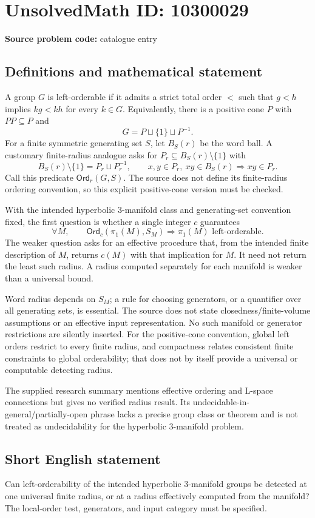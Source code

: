 \documentclass[11pt]{article}
\begin{document}
\section*{UnsolvedMath ID: 10300029}
\textbf{Source problem code:} catalogue entry
\subsection{Definitions and mathematical statement}
A group \(G\) is left-orderable if it admits a strict total order \(<\) such that \(g<h\) implies \(kg<kh\) for every \(k\in G\). Equivalently, there is a positive cone \(P\) with \(PP\subseteq P\) and
\[
G=P\sqcup\{1\}\sqcup P^{-1}.
\]
For a finite symmetric generating set \(S\), let \(B_S(r)\) be the word ball. A customary finite-radius analogue asks for \(P_r\subseteq B_S(r)\setminus\{1\}\) with
\[
B_S(r)\setminus\{1\}=P_r\sqcup P_r^{-1},\qquad
x,y\in P_r,\ xy\in B_S(r)\Longrightarrow xy\in P_r.
\]
Call this predicate \(\mathsf{Ord}_r(G,S)\). The source does not define its finite-radius ordering convention, so this explicit positive-cone version must be checked.

With the intended hyperbolic \(3\)-manifold class and generating-set convention fixed, the first question is whether a single integer \(c\) guarantees
\[
\forall M,\qquad
\mathsf{Ord}_c(\pi_1(M),S_M)\Longrightarrow\pi_1(M)\text{ left-orderable}.
\]
The weaker question asks for an effective procedure that, from the intended finite description of \(M\), returns \(c(M)\) with that implication for \(M\). It need not return the least such radius. A radius computed separately for each manifold is weaker than a universal bound.

Word radius depends on \(S_M\); a rule for choosing generators, or a quantifier over all generating sets, is essential. The source does not state closedness/finite-volume assumptions or an effective input representation. No such manifold or generator restrictions are silently inserted. For the positive-cone convention, global left orders restrict to every finite radius, and compactness relates consistent finite constraints to global orderability; that does not by itself provide a universal or computable detecting radius.

The supplied research summary mentions effective ordering and L-space connections but gives no verified radius result. Its undecidable-in-general/partially-open phrase lacks a precise group class or theorem and is not treated as undecidability for the hyperbolic \(3\)-manifold problem.
\subsection{Short English statement}
Can left-orderability of the intended hyperbolic \(3\)-manifold groups be detected at one universal finite radius, or at a radius effectively computed from the manifold? The local-order test, generators, and input category must be specified.
\end{document}
